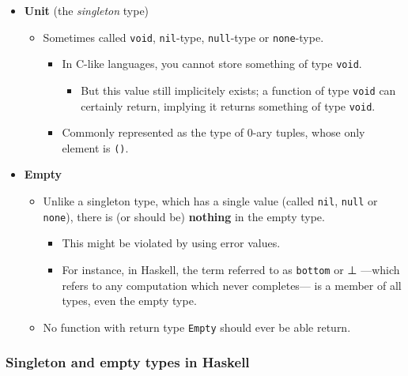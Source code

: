 \documentclass[11pt]{article}
\theoremstyle{definition}
\begin{document}
\begin{itemize}
\item \textbf{Unit} (the \emph{singleton} type)
\begin{itemize}
\item Sometimes called \texttt{void}, \texttt{nil}-type, \texttt{null}-type or \texttt{none}-type.
\begin{itemize}
\item In C-like languages, you cannot store something of type \texttt{void}.
\begin{itemize}
\item But this value still implicitely exists;
a function of type \texttt{void} can certainly
return, implying it returns something of type \texttt{void}.
\end{itemize}
\item Commonly represented as the type of 0-ary tuples,
whose only element is \texttt{()}.
\end{itemize}
\end{itemize}
\item \textbf{Empty}
\begin{itemize}
\item Unlike a singleton type, which has a single value
(called \texttt{nil}, \texttt{null} or \texttt{none}), there is
(or should be) \textbf{nothing} in the empty type.
\begin{itemize}
\item This might be violated by using error values.
\item For instance, in Haskell, the term referred to as \texttt{bottom} or ⊥
—which refers to any computation which never completes—
 is a member of all types, even the empty type.
\end{itemize}
\item No function with return type \texttt{Empty} should
ever be able return.
\end{itemize}
\end{itemize}

\subsubsection{Singleton and empty types in Haskell}
\label{sec:org3490bab}
\end{document}
